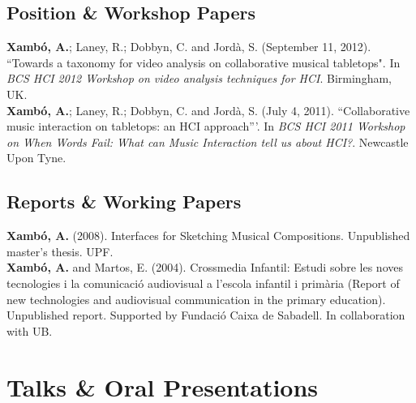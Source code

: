 \documentclass[10pt, a4paper]{article}
\newcommand{\years}[1]{\marginnote{\scriptsize #1}}
\begin{document}
\subsection*{Position \& Workshop Papers}
\noindent

\years{2012}\textbf{Xambó, A.}; Laney, R.; Dobbyn, C. and Jordà, S. (September 11, 2012). “Towards a taxonomy for video analysis on collaborative musical tabletops". In \emph{BCS HCI 2012 Workshop on video analysis techniques for HCI}. Birmingham, UK.\\
\years{2011}\textbf{Xambó, A.}; Laney, R.; Dobbyn, C. and Jordà, S. (July 4, 2011). ``Collaborative music interaction on tabletops: an HCI approach'''. In \emph{BCS HCI 2011 Workshop on When Words Fail: What can Music Interaction tell us about HCI?}. Newcastle Upon Tyne.

\subsection*{Reports \& Working Papers}
\noindent

\years{2008}\textbf{Xambó, A.} (2008). Interfaces for Sketching Musical Compositions. Unpublished master's thesis. UPF.\\ 
\years{2004}\textbf{Xambó, A.} and Martos, E. (2004). Crossmedia Infantil: Estudi sobre les noves tecnologies i la comunicació audiovisual a l'escola infantil i primària (Report of new technologies and audiovisual communication in the primary education). Unpublished report. Supported by Fundació Caixa de Sabadell. In collaboration with UB.

\section*{Talks \& Oral Presentations}
\end{document}
